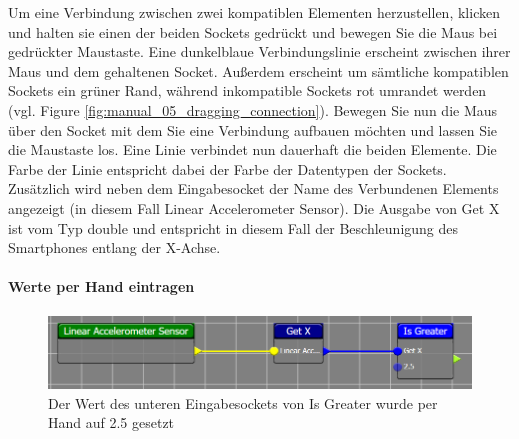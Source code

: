 Um eine Verbindung zwischen zwei kompatiblen Elementen herzustellen, klicken und halten sie einen der beiden Sockets gedr\"uckt und bewegen Sie die Maus bei gedr\"uckter Maustaste. Eine dunkelblaue Verbindungslinie erscheint zwischen ihrer Maus und dem gehaltenen Socket. Au{\ss}erdem erscheint um s\"amtliche kompatiblen Sockets ein gr\"uner Rand, w\"ahrend inkompatible Sockets rot umrandet werden (vgl. Figure \ref{fig:manual_05_dragging_connection}). Bewegen Sie nun die Maus \"uber den Socket mit dem Sie eine Verbindung aufbauen m\"ochten und lassen Sie die Maustaste los. Eine Linie verbindet nun dauerhaft die beiden Elemente. Die Farbe der Linie entspricht dabei der Farbe der Datentypen der Sockets. Zus\"atzlich wird neben dem Eingabesocket der Name des Verbundenen Elements angezeigt (in diesem Fall Linear Accelerometer Sensor). Die Ausgabe von Get X ist vom Typ double und entspricht in diesem Fall der Beschleunigung des Smartphones entlang der X-Achse.

\paragraph{Werte per Hand eintragen}

\begin{figure}[h!]
	\centering
		\includegraphics[width = \textwidth]{Manual/08_enter_value_cut}
	\caption{Der Wert des unteren Eingabesockets von Is Greater wurde per Hand auf 2.5 gesetzt}
	\label{fig:08_enter_value_cut}
\end{figure}

